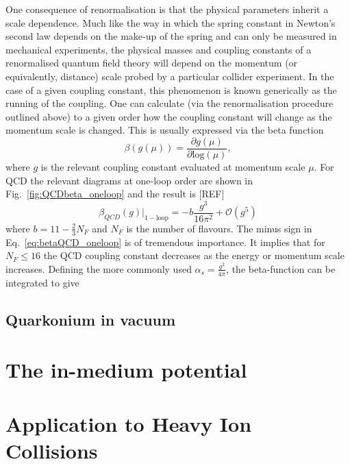 \documentclass[12pt, a4paper, twoside]{book}
\newcommand{\brac}[1] {\!\left(#1\right)}
\begin{document}
One consequence of renormalisation is that the physical parameters inherit a scale dependence. Much like the way in which the spring constant in Newton's second law depends on the make-up of the spring and can only be measured in mechanical experiments, the physical masses and coupling constants of a renormalised quantum field theory will depend on the momentum (or equivalently, distance) scale probed by a particular collider experiment. In the case of a given coupling constant, this phenomenon is known generically as the running of the coupling. One can calculate (via the renormalisation procedure outlined above) to a given order how the coupling constant will change as the momentum scale is changed. This is usually expressed via the beta function
\begin{equation}
\label{eq:betafunc}
\beta\brac{g\brac{\mu}}=\frac{\partial g\brac{\mu}}{\partial \mathrm{log}\brac{\mu}},
\end{equation}
where \(g\) is the relevant coupling constant evaluated at momentum scale \(\mu\). For QCD the relevant diagrams at one-loop order are shown in Fig.~\ref{fig:QCDbeta_oneloop} and the result is [REF]
\begin{equation}
\label{eq:betaQCD_oneloop}
\beta_{QCD}\brac{g}\lvert_{\mathrm{1-loop}}=-b\frac{g^3}{16\pi^2}+\mathcal{O}\brac{g^5}
\end{equation}
where \(b=11-\frac{2}{3}N_F\) and \(N_F\) is the number of flavours. The minus sign in Eq.~\eqref{eq:betaQCD_oneloop} is of tremendous importance. It implies that for \(N_F\leq 16\) the QCD coupling constant decreases as the energy or momentum scale increases. Defining the more commonly used \(\alpha_s=\frac{g^2}{4\pi}\), the beta-function can be integrated to give
\begin{equation}
\label{eq:gQCD_oneloop}

\end{equation}

\section{Quarkonium in vacuum}
\label{sec:quark_vav}
\onehalfspacing
\chapter{The in-medium potential}
\label{sec:med_pot}
\onehalfspacing
\chapter{Application to Heavy Ion Collisions}
\label{sec:app_HIC}
\onehalfspacing
\end{document}
